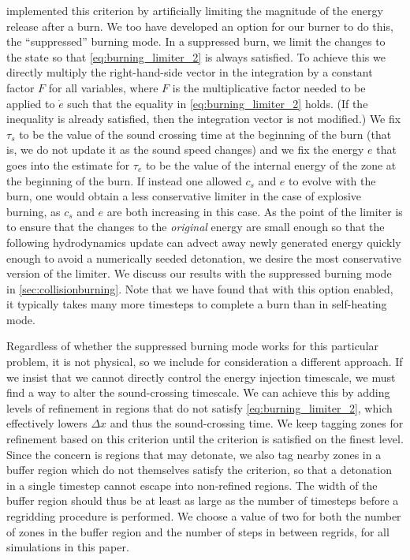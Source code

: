 \documentclass[twocolumn,numberedappendix]{../aastex6}
\begin{document}
\citet{kushnir:2013} implemented this criterion by artificially 
limiting the magnitude of the energy release after a burn. We
too have developed an option for our burner to do this,
the ``suppressed'' burning mode. In a suppressed burn, we limit
the changes to the state so that \autoref{eq:burning_limiter_2}
is always satisfied. To achieve this we directly multiply the
right-hand-side vector in the integration by a constant factor $F$
for all variables, where $F$ is the multiplicative factor needed to
be applied to $\dot{e}$ such that the equality in \autoref{eq:burning_limiter_2}
holds. (If the inequality is already satisfied, then the integration
vector is not modified.) We fix $\tau_s$ to be the value of the sound
crossing time at the beginning of the burn (that is, we do not
update it as the sound speed changes) and we fix the energy $e$
that goes into the estimate for $\tau_e$ to be the value of the
internal energy of the zone at the beginning of the burn. If
instead one allowed $c_s$ and $e$ to evolve with the burn, one
would obtain a less conservative limiter in the case of explosive
burning, as $c_s$ and $e$ are both increasing in this case.
As the point of the limiter is to ensure that the changes to the
\textit{original} energy are small enough so that the following
hydrodynamics update can advect away newly generated energy
quickly enough to avoid a numerically seeded detonation,
we desire the most conservative version of the limiter. We discuss
our results with the suppressed burning mode in \autoref{sec:collisionburning}.
Note that we have found that with this option enabled, it typically takes
many more timesteps to complete a burn than in self-heating mode.

Regardless of whether the suppressed burning mode works for this
particular problem, it is not physical, so we include for
consideration a different approach. If we insist that we
cannot directly control the energy injection timescale, we 
must find a way to alter the sound-crossing timescale. 
We can achieve this by adding levels of refinement in 
regions that do not satisfy \autoref{eq:burning_limiter_2},
which effectively lowers $\Delta x$ and thus the
sound-crossing time. We keep tagging zones for refinement
based on this criterion until the criterion is satisfied
on the finest level. Since the concern is regions that 
may detonate, we also tag nearby zones in a buffer region
which do not themselves satisfy the criterion,
so that a detonation in a single timestep cannot 
escape into non-refined regions. The width of the buffer 
region should thus be at least as large as the number of 
timesteps before a regridding procedure is performed.
We choose a value of two for both the number of zones in the 
buffer region and the number of steps in between regrids,
for all simulations in this paper.
\end{document}

